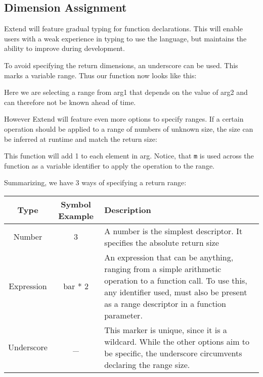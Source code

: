 \subsection{Dimension Assignment}
\par Extend will feature gradual typing for function declarations. This will enable users with a weak experience in typing to use the language, but maintains the ability to improve during development.
\par To avoid specifying the return dimensions, an underscore can be used. This marks a variable range. Thus our function now looks like this:

Here we are selecting a range from arg1 that depends on the value of arg2 and can therefore not be known ahead of time.
\par However Extend will feature even more options to specify ranges. If a certain operation should be applied to a range of numbers of unknown size, the size can be inferred at runtime and match the return size:

This function will add 1 to each element in arg. Notice, that \texttt{m} is used across the function as a variable identifier to apply the operation to the range.
\par Summarizing, we have 3 ways of specifying a return range:\newline
\begin{tabularx}{\columnwidth}{| c | c | X |} \hline
Type & Symbol Example & Description \\ \hline
Number & 3 & A number is the simplest descriptor. It specifies the absolute return size \\ \hline
Expression & bar * 2 & An expression that can be anything, ranging from a simple arithmetic operation to a function call. To use this, any identifier used, must also be present as a range descriptor in a function parameter. \\ \hline
Underscore & \_ & This marker is unique, since it is a wildcard. While the other options aim to be specific, the underscore circumvents declaring the range size. \\ \hline
\end{tabularx}
